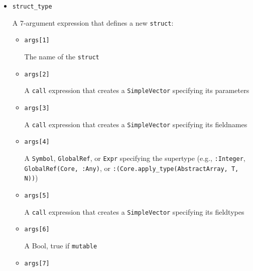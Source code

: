 \begin{itemize}
\begin{itemize}
\item \texttt{args[2]}

A \texttt{SimpleVector} of argument type data. \texttt{args[2][1]} is a \texttt{SimpleVector} of the argument types, and \texttt{args[2][2]} is a \texttt{SimpleVector} of type variables corresponding to the method{\textquotesingle}s static parameters.


\item \texttt{args[3]}

A \texttt{CodeInfo} of the method itself. For {\textquotedbl}out of scope{\textquotedbl} method definitions (adding a method to a function that also has methods defined in different scopes) this is an expression that evaluates to a \texttt{:lambda} expression.

\end{itemize}

\item \texttt{struct\_type}

A 7-argument expression that defines a new \texttt{struct}:

\begin{itemize}
\item \texttt{args[1]}

The name of the \texttt{struct}


\item \texttt{args[2]}

A \texttt{call} expression that creates a \texttt{SimpleVector} specifying its parameters


\item \texttt{args[3]}

A \texttt{call} expression that creates a \texttt{SimpleVector} specifying its fieldnames


\item \texttt{args[4]}

A \texttt{Symbol}, \texttt{GlobalRef}, or \texttt{Expr} specifying the supertype (e.g., \texttt{:Integer}, \texttt{GlobalRef(Core, :Any)}, or \texttt{:(Core.apply\_type(AbstractArray, T, N))})


\item \texttt{args[5]}

A \texttt{call} expression that creates a \texttt{SimpleVector} specifying its fieldtypes


\item \texttt{args[6]}

A Bool, true if \texttt{mutable}


\item \texttt{args[7]}


\end{itemize}
\end{itemize}
